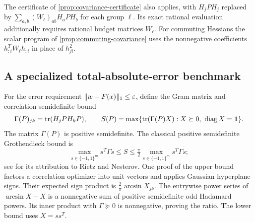The certificate of \cref{prop:covariance-certificate} also applies, with
$H_jPH_j$ replaced by $\sum_{a,b}(W_\ell)_{ab}H_aPH_b$ for each group
$\ell$. Its exact rational evaluation additionally requires rational
budget matrices $W_\ell$. For commuting Hessians the scalar program of
\cref{prop:commuting-covariance} uses the nonnegative
coefficients $h_{:i}^TW_\ell h_{:i}$ in place of $h_{ji}^2$.

\subsection{A specialized total-absolute-error benchmark}

For the error requirement $\|w-F(x)\|_1\le\varepsilon$, define the Gram matrix
and correlation semidefinite bound
\begin{equation}\label{eq:l1-covariance}
 \Gamma(P)_{jk}=\operatorname{tr}(H_jPH_kP),\qquad
 S(P)=\max\{\operatorname{tr}(\Gamma(P)X):X\succeq0,\ \operatorname{diag} X=\mathbf1\}.
\end{equation}
The matrix $\Gamma(P)$ is positive semidefinite. The classical positive
semidefinite Grothendieck bound is
\begin{equation}\label{eq:psd-grothendieck}
 \max_{s\in\{-1,1\}^m}s^T\Gamma s
 \le S\le\tfrac\pi2\max_{s\in\{-1,1\}^m}s^T\Gamma s;
\end{equation}
see \citet{briet2010} for its attribution to Rietz and Nesterov.
One proof of the upper bound factors a correlation optimizer into unit
vectors and applies Gaussian hyperplane signs. Their expected sign product
is $\frac2\pi\arcsin X_{jk}$. The entrywise power series of
$\arcsin X-X$ is a nonnegative sum of positive semidefinite odd Hadamard
powers. Its inner product with $\Gamma\succeq0$ is nonnegative, proving
the ratio. The lower bound uses $X=ss^T$.


